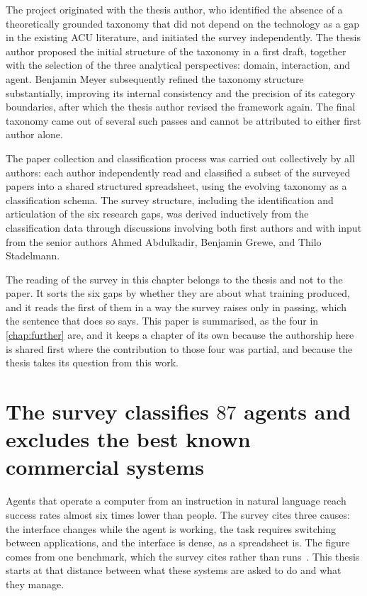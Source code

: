 The project originated with the thesis author, who identified the absence of a
theoretically grounded taxonomy that did not depend on the technology as a gap
in the existing ACU literature, and initiated the survey independently. The
thesis author proposed the initial structure of the taxonomy in a first draft,
together with the selection of the three analytical perspectives: domain,
interaction, and agent. Benjamin Meyer subsequently refined the taxonomy
structure substantially, improving its internal consistency and the precision
of its category boundaries, after which the thesis author revised the framework
again. The final taxonomy came out of several such passes and cannot be
attributed to either first author alone.

The paper collection and classification process was carried out collectively by
all authors: each author independently read and classified a subset of the
surveyed papers into a shared structured spreadsheet, using the evolving
taxonomy as a classification schema. The survey structure, including the
identification and articulation of the six research gaps, was derived
inductively from the classification data through discussions involving both
first authors and with input from the senior authors Ahmed Abdulkadir,
Benjamin Grewe, and Thilo Stadelmann.

The reading of the survey in this chapter belongs to the thesis and not to
the paper. It sorts the six gaps by whether they are about what training produced,
and it reads the first of them in a way the survey raises only in passing,
which the sentence that does so says. This paper is summarised, as the four in
\cref{chap:further} are, and it keeps a chapter of its own because the
authorship here is shared first where the contribution to those four was
partial, and because the thesis takes its question from this work.

\section{The survey classifies \texorpdfstring{$87$}{87} agents and excludes the best known commercial systems}
\label{sec:acu_scope}

Agents that operate a computer from an instruction in natural language reach
success rates almost six times lower than people. The survey cites three
causes: the interface changes while the agent is working, the task requires
switching between applications, and the interface is dense, as a spreadsheet
is. The figure comes from one benchmark, which the survey cites rather than
runs~\cite{sager_survey_2026}. This thesis starts at that distance between
what these systems are asked to do and what they manage.

